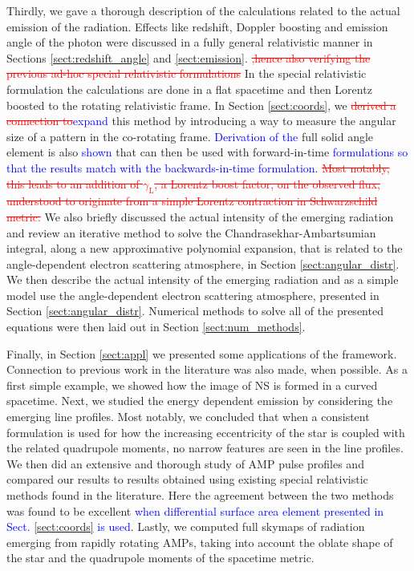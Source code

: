 \documentclass{aa}
\newcommand{\refe}[1]{\textcolor{blue}{{#1}}}
\newcommand{\refedel}[1]{\textcolor{red}{\sout{#1}}}
\newcommand{\sch}{Schwarzschild }
\newcommand{\lgamma}{\gamma_{\text{L}}}
\begin{document}
Thirdly, we gave a thorough description of the calculations related to the actual emission of the radiation.
Effects like redshift, Doppler boosting and emission angle of the photon were discussed in a fully general relativistic manner in Sections \ref{sect:redshift_angle} and \ref{sect:emission}. 
\refedel{,hence also verifying the previous ad-hoc special relativistic formulations}%
In the special relativistic formulation \citep[see e.g.,][]{PB06} the calculations are done in a flat spacetime and then Lorentz boosted to the rotating relativistic frame.
In Section \ref{sect:coords}, we \refedel{derived a connection to}\refe{expand} this method by introducing a way to measure the angular size of a pattern in the co-rotating frame.
\refe{Derivation of the} full solid angle element is also \refe{shown} that can then be used with forward-in-time \refe{formulations so that the results match with the backwards-in-time formulation}.
\refedel{Most notably, this leads to an addition of $\lgamma$, a Lorentz boost factor, on the observed flux, understood to originate from a simple Lorentz contraction in \sch metric.}
We also briefly discussed the actual intensity of the emerging radiation and review an iterative method to solve the Chandrasekhar-Ambartsumian integral, along a new approximative polynomial expansion, that is related to the angle-dependent electron scattering atmosphere, in Section \ref{sect:angular_distr}.
We then describe the actual intensity of the emerging radiation and as a simple model use the angle-dependent electron scattering atmosphere, presented in Section \ref{sect:angular_distr}.
Numerical methods to solve all of the presented equations were then laid out in Section \ref{sect:num_methods}.

Finally, in Section \ref{sect:appl} we presented some applications of the framework.
Connection to previous work in the literature was also made, when possible.
As a first simple example, we showed how the image of NS is formed in a curved spacetime.
Next, we studied the energy dependent emission by considering the emerging line profiles.
Most notably, we concluded that when a consistent formulation is used for how the increasing eccentricity of the star is coupled with the related quadrupole moments, no narrow features are seen in the line profiles.
We then did an extensive and thorough study of AMP pulse profiles and compared our results to results obtained using existing special relativistic methods found in the literature.
Here the agreement between the two methods was found to be excellent \refe{when differential surface area element presented in Sect. \ref{sect:coords} is used}.
Lastly, we computed full skymaps of radiation emerging from rapidly rotating AMPs, taking into account the oblate shape of the star and the quadrupole moments of the spacetime metric.
\end{document}
